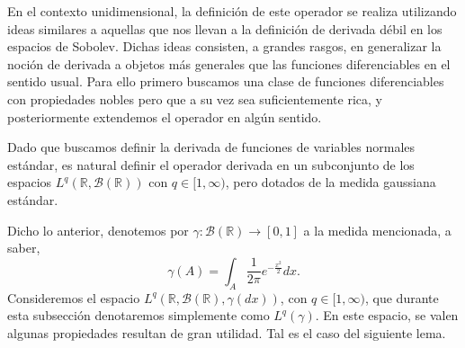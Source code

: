\documentclass[letterpaper,twoside,12pt]{book}
\newcommand{\R}{\mathbb{R}}
\newcommand{\B}{\mathcal{B}}
\newcommand{\1}{\mathds{1}}
\renewcommand{\to}{\rightarrow}
\theoremstyle{definition}
\theoremstyle{definition}
\theoremstyle{remark}
\theoremstyle{definition}
\theoremstyle{definition}
\theoremstyle{definition}
\theoremstyle{definition}
\theoremstyle{definition}
\begin{document}
En el contexto unidimensional, la definición de este operador se realiza utilizando ideas similares a aquellas que nos llevan a la definición de derivada débil en los espacios de Sobolev. Dichas ideas consisten, a grandes rasgos, en generalizar la noción de derivada a objetos más generales que las funciones diferenciables en el sentido usual. Para ello primero buscamos una clase de funciones diferenciables con propiedades nobles pero que a su vez sea suficientemente rica, y posteriormente extendemos el operador en algún sentido.

Dado que buscamos definir la derivada de funciones de variables normales estándar, es natural definir el operador derivada en un subconjunto de los espacios $L^q(\R,\B(\R))$ con $q\in [1,\infty)$, pero dotados de la medida gaussiana estándar. 

Dicho lo anterior, denotemos por $\gamma:\B(\R)\to [0,1]$ a la medida mencionada, a saber, 
\[
\gamma(A)=\int_A\frac{1}{2\pi}e^{-\frac{x^2}{2}}dx.    
\]
Consideremos el espacio $L^{q}(\R,\B(\R),\gamma(dx))$, con $q\in [1,\infty)$, que durante esta subsección denotaremos simplemente como $L^{q}(\gamma)$. En este espacio, se valen algunas propiedades resultan de gran utilidad. Tal es el caso del siguiente lema.
\end{document}
